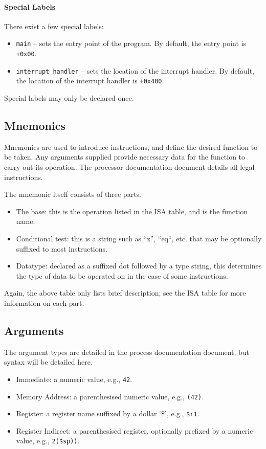 \documentclass{article}
\begin{document}
\paragraph*{Special Labels}
There exist a few special labels:
\begin{itemize}
    \item \texttt{main} -- sets the entry point of the program.
    By default, the entry point is \texttt{+0x00}.
    \item \texttt{interrupt\_handler} -- sets the location of the interrupt handler.
    By default, the location of the interrupt handler is \texttt{+0x400}.
\end{itemize}

Special labels may only be declared once.

\subsection{Mnemonics}

Mnemonics are used to introduce instructions, and define the desired function to be taken.
Any arguments supplied provide necessary data for the function to carry out its operation.
The processor documentation document details all legal instructions.

The mnemonic itself consists of three parts.
\begin{itemize}
    \item The base: this is the operation listed in the ISA table, and is the function name.
    \item Conditional test: this is a string such as ``z'', ``eq``, etc. that may be optionally suffixed to most instructions.
    \item Datatype: declared as a suffixed dot followed by a type string, this determines the type of data to be operated on in the case of some instructions.
\end{itemize}

Again, the above table only lists brief description; see the ISA table for more information on each part.

\subsection{Arguments}

The argument types are detailed in the process documentation document, but syntax will be detailed here.
\begin{itemize}
    \item Immediate: a numeric value, e.g., \texttt{42}.
    \item Memory Address: a parenthesised numeric value, e.g., \texttt{(42)}.
    \item Register: a register name suffixed by a dollar `\$', e.g., \texttt{\$r1}.
    \item Register Indirect: a parenthesised register, optionally prefixed by a numeric value, e.g., \texttt{2(\$sp))}.
\end{itemize}
\end{document}
